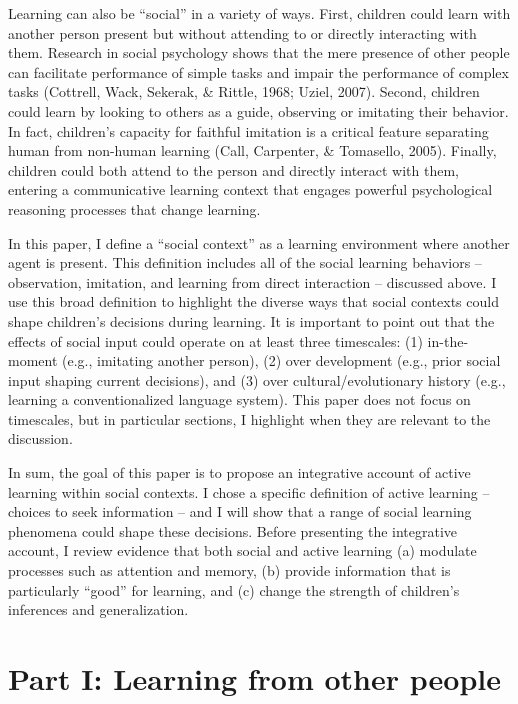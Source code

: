\documentclass[oneside]{report}
\begin{document}
Learning can also be ``social'' in a variety of ways. First, children
could learn with another person present but without attending to or
directly interacting with them. Research in social psychology shows that
the mere presence of other people can facilitate performance of simple
tasks and impair the performance of complex tasks (Cottrell, Wack,
Sekerak, \& Rittle, 1968; Uziel, 2007). Second, children could learn by
looking to others as a guide, observing or imitating their behavior. In
fact, children's capacity for faithful imitation is a critical feature
separating human from non-human learning (Call, Carpenter, \& Tomasello,
2005). Finally, children could both attend to the person and directly
interact with them, entering a communicative learning context that
engages powerful psychological reasoning processes that change learning.

In this paper, I define a ``social context'' as a learning environment
where another agent is present. This definition includes all of the
social learning behaviors -- observation, imitation, and learning from
direct interaction -- discussed above. I use this broad definition to
highlight the diverse ways that social contexts could shape children's
decisions during learning. It is important to point out that the effects
of social input could operate on at least three timescales: (1)
in-the-moment (e.g., imitating another person), (2) over development
(e.g., prior social input shaping current decisions), and (3) over
cultural/evolutionary history (e.g., learning a conventionalized
language system). This paper does not focus on timescales, but in
particular sections, I highlight when they are relevant to the
discussion.

In sum, the goal of this paper is to propose an integrative account of
active learning within social contexts. I chose a specific definition of
active learning -- choices to seek information -- and I will show that a
range of social learning phenomena could shape these decisions. Before
presenting the integrative account, I review evidence that both social
and active learning (a) modulate processes such as attention and memory,
(b) provide information that is particularly ``good'' for learning, and
(c) change the strength of children's inferences and generalization.

\hypertarget{p1}{%
\section{Part I: Learning from other people}\label{p1}}
\end{document}
